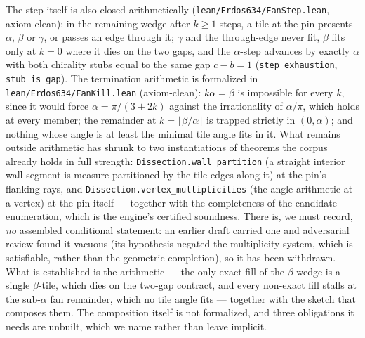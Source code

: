 \documentclass[11pt,reqno]{amsart}
\theoremstyle{plain}
\theoremstyle{definition}
\begin{document}
The step itself is also closed arithmetically (\texttt{lean/Erdos634/FanStep.lean}, axiom-clean):
in the remaining wedge after $k\ge1$ steps, a tile at the pin presents $\alpha$, $\beta$ or
$\gamma$, or passes an edge through it; $\gamma$ and the through-edge never fit, $\beta$ fits
only at $k=0$ where it dies on the two gaps, and the $\alpha$-step advances by exactly $\alpha$
with both chirality stubs equal to the same gap $c-b=1$ (\texttt{step\_exhaustion},
\texttt{stub\_is\_gap}). The termination arithmetic is formalized in
\texttt{lean/Erdos634/FanKill.lean} (axiom-clean):
$k\alpha=\beta$ is impossible for every $k$, since it would force $\alpha=\pi/(3+2k)$ against the
irrationality of $\alpha/\pi$, which holds at every member; the remainder at
$k=\lfloor\beta/\alpha\rfloor$ is trapped strictly in $(0,\alpha)$; and nothing whose angle is at
least the minimal tile angle fits in it. What remains outside arithmetic has shrunk to two instantiations of theorems the corpus already
holds in full strength: \texttt{Dissection.wall\_partition} (a straight interior wall segment is
measure-partitioned by the tile edges along it) at the pin's flanking rays, and
\texttt{Dissection.vertex\_multiplicities} (the angle arithmetic at a vertex) at the pin itself
--- together with the completeness of the candidate enumeration, which is the engine's certified
soundness. There is, we must record, \emph{no} assembled conditional statement: an earlier draft carried one
and adversarial review found it vacuous (its hypothesis negated the multiplicity system, which is
satisfiable, rather than the geometric completion), so it has been withdrawn. What is established
is the arithmetic --- the only exact fill of the $\beta$-wedge is a single $\beta$-tile, which
dies on the two-gap contract, and every non-exact fill stalls at the sub-$\alpha$ fan remainder,
which no tile angle fits --- together with the sketch that composes them. The composition itself
is not formalized, and three obligations it needs are unbuilt, which we name rather than leave
implicit.
\end{document}
